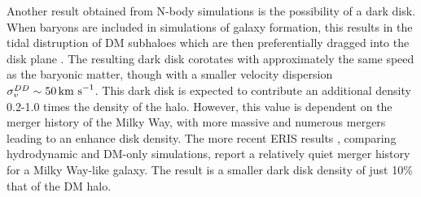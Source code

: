 Another result obtained from N-body simulations is the possibility of a dark disk. When baryons are included in simulations of galaxy formation, this results in the tidal distruption of DM subhaloes which are then preferentially dragged into the disk plane \cite{Read:2009, Read:2010}. The resulting dark disk corotates with approximately the same speed as the baryonic matter, though with a smaller velocity dispersion $\sigma_v^{DD} \sim 50 \,\textrm{km s}^{-1}$. This dark disk is expected to contribute an additional density 0.2-1.0 times the density of the halo. However, this value is dependent on the merger history of the Milky Way, with more massive and numerous mergers leading to an enhance disk density. The more recent ERIS results \cite{Pillepich:2014}, comparing hydrodynamic and DM-only simulations, report a relatively quiet merger history for a Milky Way-like galaxy. The result is a smaller dark disk density of just 10\% that of the DM halo.


